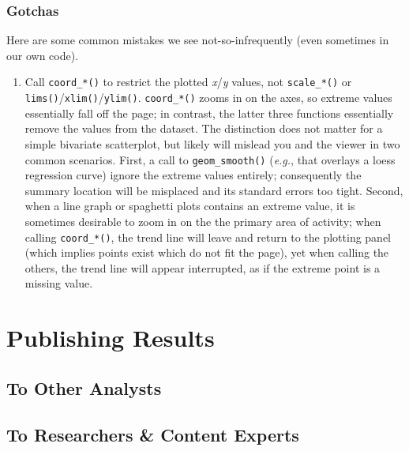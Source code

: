 \documentclass[]{book}
\providecommand{\tightlist}{%
  \setlength{\itemsep}{0pt}\setlength{\parskip}{0pt}}
\begin{document}
\hypertarget{gotchas}{%
\subsection{Gotchas}\label{gotchas}}

Here are some common mistakes we see not-so-infrequently (even sometimes in our own code).

\begin{enumerate}
\def\labelenumi{\arabic{enumi}.}
\tightlist
\item
  Call \texttt{coord\_*()} to restrict the plotted \emph{x}/\emph{y} values, not \texttt{scale\_*()} or \texttt{lims()}/\texttt{xlim()}/\texttt{ylim()}. \texttt{coord\_*()} zooms in on the axes, so extreme values essentially fall off the page; in contrast, the latter three functions essentially remove the values from the dataset. The distinction does not matter for a simple bivariate scatterplot, but likely will mislead you and the viewer in two common scenarios. First, a call to \texttt{geom\_smooth()} (\emph{e.g.}, that overlays a loess regression curve) ignore the extreme values entirely; consequently the summary location will be misplaced and its standard errors too tight. Second, when a line graph or spaghetti plots contains an extreme value, it is sometimes desirable to zoom in on the the primary area of activity; when calling \texttt{coord\_*()}, the trend line will leave and return to the plotting panel (which implies points exist which do not fit the page), yet when calling the others, the trend line will appear interrupted, as if the extreme point is a missing value.
\end{enumerate}

\hypertarget{publication}{%
\chapter{Publishing Results}\label{publication}}

\hypertarget{to-other-analysts}{%
\section{To Other Analysts}\label{to-other-analysts}}

\hypertarget{to-researchers-content-experts}{%
\section{To Researchers \& Content Experts}\label{to-researchers-content-experts}}
\end{document}
